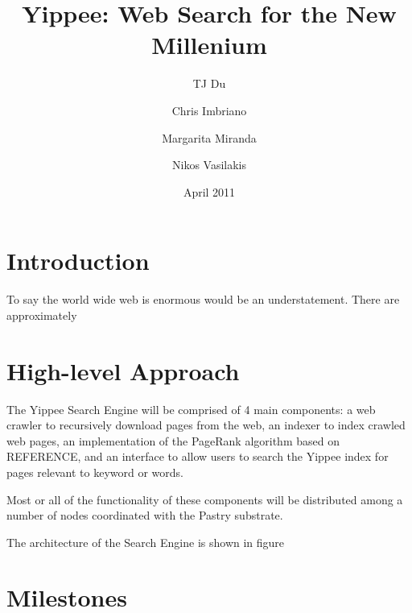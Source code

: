 \documentclass[11pt, letterpaper, oneside, twocolumn]{article}
\begin{document}
\title{Yippee: Web Search for the New Millenium}
\author{	TJ Du
	\and Chris Imbriano
	\and Margarita Miranda
	\and Nikos Vasilakis}
\date{April 2011}

\maketitle

\section{ Introduction }

To say the world wide web is enormous would be an understatement.  There are approximately 

\section{ High-level Approach }

The Yippee Search Engine will be comprised of 4 main components: a web crawler to recursively download pages from the web, an indexer to index crawled web pages, an implementation of the PageRank algorithm based on REFERENCE, and an interface to allow users to search the Yippee index for pages relevant to keyword or words.

Most or all of the functionality of these components will be distributed among a number of nodes coordinated with the Pastry substrate. 

The architecture of the Search Engine is shown in figure

\section{ Milestones }
\end{document}
